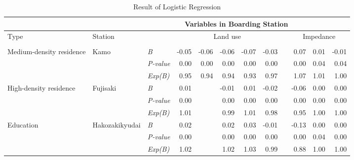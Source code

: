 \begin{sidewaystable}[htbp]
	\centering
	\caption{Result of Logistic Regression}
	\label{tab:chp3:Result}
	\scriptsize %
	\renewcommand{\arraystretch}{1} %
	
	\begin{tabular}{p{7em}p{5em}p{5em}<{\centering}rrrrrrrrr}
		\Xhline{1.5pt}
		
		\multicolumn{2}{c}{Destination Station} & & \multicolumn{9}{c}{Variables in Boarding Station} \\
		\midrule
		
		\multirow{2}[5]{7em}{Type} & \multirow{2}[5]{5em}{Station} & \multirow{2}[5]{5em}{\centering{Statistical index}} & \multicolumn{5}{c}{Land use} & & \multicolumn{3}{c}{Impedance} \\
		\cmidrule{4-8} \cmidrule{10-12}
		
		& & & 
		\multicolumn{1}{p{5em}}{\centering{Commerce}} & 
		\multicolumn{1}{p{5em}}{\centering{Office}} & 
		\multicolumn{1}{p{5em}}{\centering{Residence}} & 
		\multicolumn{1}{p{5em}}{\centering{Education}} & 
		\multicolumn{1}{p{5em}}{\centering{Land use Aggregation}} & &  \multicolumn{1}{p{5em}}{\centering{Distance}} & 
		\multicolumn{1}{p{5em}}{\centering{Bus Capacity}} & 
		\multicolumn{1}{p{5em}}{\centering{Bus Accessibility}} \\
		\midrule
		
		\multirow{3}[0]{7em}{Medium-density residence} & \multirow{3}[0]{5em}{Kamo} & \textsl{B} & -0.05 & -0.06 & -0.06 & -0.07 & -0.03 & & 0.07 & 0.01 & -0.01 \\
		& & \textsl{P-value} & 0.00 & 0.00 & 0.00 & 0.00 & 0.00 & & 0.00 & 0.04 & 0.04 \\
		& & \textsl{Exp(B)} & 0.95 & 0.94 & 0.94 & 0.93 & 0.97 & & 1.07 & 1.01 & 1.00 \\
		\midrule
		
		\multirow{3}[0]{7em}{High-density residence} & \multirow{3}[0]{5em}{Fujisaki} & \textsl{B} & 0.01 & & -0.01 & 0.01 & -0.02 & & -0.06 & 0.00 & 0.00 \\
		& & \textsl{P-value} & 0.00 & & 0.00 & 0.00 & 0.00 & & 0.00 & 0.00 & 0.00 \\
		& & \textsl{Exp(B)} & 1.01 & & 0.99 & 1.01 & 0.98 & & 0.95 & 1.00 & 1.00 \\
		\midrule
		
		\multirow{3}[0]{7em}{Education} & \multirow{3}[0]{5em}{Hakozakikyudai} & \textsl{B} & 0.02 & & 0.02 & 0.03 & -0.01 & & -0.13 & 0.00 & 0.00 \\
		& & \textsl{P-value} & 0.00 & & 0.00 & 0.00 & 0.00 & & 0.00 & 0.04 & 0.00 \\
		& & \textsl{Exp(B)} & 1.02 & & 1.02 & 1.03 & 0.99 & & 0.88 & 1.00 & 1.00 \\
		\midrule
		

\end{tabular}
\end{sidewaystable}
